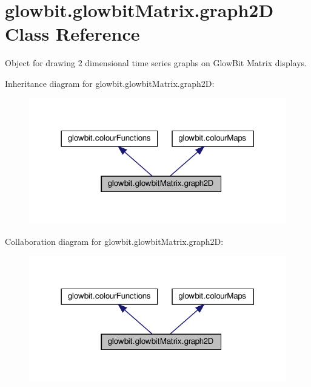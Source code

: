 \hypertarget{classglowbit_1_1glowbitMatrix_1_1graph2D}{}\section{glowbit.\+glowbit\+Matrix.\+graph2D Class Reference}
\label{classglowbit_1_1glowbitMatrix_1_1graph2D}


Object for drawing 2 dimensional time series graphs on Glow\+Bit Matrix displays.  




Inheritance diagram for glowbit.\+glowbit\+Matrix.\+graph2D\+:\nopagebreak
\begin{figure}[H]
\begin{center}
\leavevmode
\includegraphics[width=318pt]{classglowbit_1_1glowbitMatrix_1_1graph2D__inherit__graph}
\end{center}
\end{figure}


Collaboration diagram for glowbit.\+glowbit\+Matrix.\+graph2D\+:\nopagebreak
\begin{figure}[H]
\begin{center}
\leavevmode
\includegraphics[width=318pt]{classglowbit_1_1glowbitMatrix_1_1graph2D__coll__graph}
\end{center}
\end{figure}
